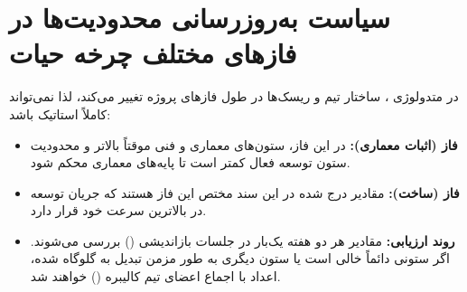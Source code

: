 \section{سیاست به‌روزرسانی محدودیت‌ها در فازهای مختلف چرخه حیات}
در متدولوژی ، ساختار تیم و ریسک‌ها در طول فازهای پروژه تغییر می‌کند، لذا  نمی‌تواند کاملاً استاتیک باشد:
\begin{itemize}
	\item \textbf{فاز  (اثبات معماری):} در این فاز،  ستون‌های معماری و  فنی موقتاً بالاتر و محدودیت ستون توسعه فعال کمتر است تا پایه‌های معماری محکم شود.
	\item \textbf{فاز  (ساخت):} مقادیر درج شده در این سند مختص این فاز هستند که جریان توسعه در بالاترین سرعت خود قرار دارد.
	\item \textbf{روند ارزیابی:} مقادیر  هر دو هفته یک‌بار در جلسات بازاندیشی () بررسی می‌شوند. اگر ستونی دائماً خالی است یا ستون دیگری به طور مزمن تبدیل به گلوگاه شده، اعداد با اجماع اعضای تیم کالیبره () خواهند شد.
\end{itemize}